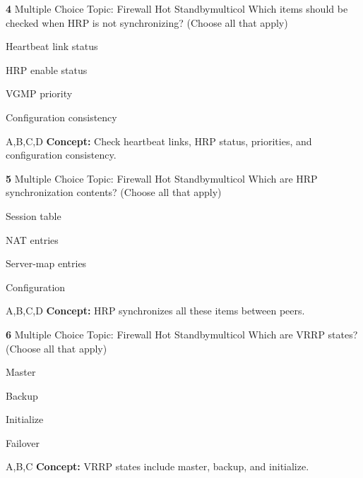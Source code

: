 \documentclass[10pt,a4paper]{article}
\begin{document}
\begin{qcard}{\color{white}\textbf{4} \hfill \small Multiple Choice \textbar{} Topic: Firewall Hot Standby}{multicol}
Which items should be checked when HRP is not synchronizing? (Choose all that apply)

\begin{qoptions}
\item Heartbeat link status
\item HRP enable status
\item VGMP priority
\item Configuration consistency
\end{qoptions}
\begin{explainbox}{A,B,C,D}
\textbf{Concept:} Check heartbeat links, HRP status, priorities, and configuration consistency.
\end{explainbox}
\end{qcard}

\begin{qcard}{\color{white}\textbf{5} \hfill \small Multiple Choice \textbar{} Topic: Firewall Hot Standby}{multicol}
Which are HRP synchronization contents? (Choose all that apply)

\begin{qoptions}
\item Session table
\item NAT entries
\item Server-map entries
\item Configuration
\end{qoptions}
\begin{explainbox}{A,B,C,D}
\textbf{Concept:} HRP synchronizes all these items between peers.
\end{explainbox}
\end{qcard}

\begin{qcard}{\color{white}\textbf{6} \hfill \small Multiple Choice \textbar{} Topic: Firewall Hot Standby}{multicol}
Which are VRRP states? (Choose all that apply)

\begin{qoptions}
\item Master
\item Backup
\item Initialize
\item Failover
\end{qoptions}
\begin{explainbox}{A,B,C}
\textbf{Concept:} VRRP states include master, backup, and initialize.
\end{explainbox}
\end{qcard}
\end{document}
